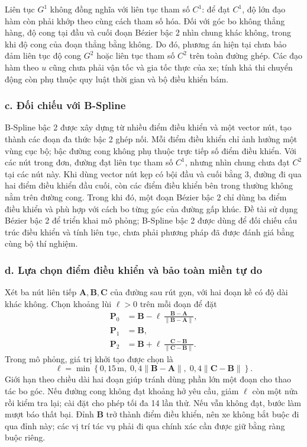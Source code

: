 \documentclass[12pt,a4paper,oneside]{report}
\begin{document}
Liên tục \(G^1\) không đồng nghĩa với liên tục tham số \(C^1\): để đạt \(C^1\), độ lớn đạo hàm còn phải khớp theo cùng cách tham số hóa. Đối với góc bo không thẳng hàng, độ cong tại đầu và cuối đoạn Bézier bậc 2 nhìn chung khác không, trong khi độ cong của đoạn thẳng bằng không. Do đó, phương án hiện tại chưa bảo đảm liên tục độ cong \(G^2\) hoặc liên tục tham số \(C^2\) trên toàn đường ghép. Các đạo hàm theo \(u\) cũng chưa phải vận tốc và gia tốc thực của xe; tính khả thi chuyển động còn phụ thuộc quy luật thời gian và bộ điều khiển bám.

\subsubsection*{c. Đối chiếu với B-Spline}

B-Spline bậc 2 được xây dựng từ nhiều điểm điều khiển và một vector nút, tạo thành các đoạn đa thức bậc 2 ghép nối. Mỗi điểm điều khiển chỉ ảnh hưởng một vùng cục bộ; bậc đường cong không phụ thuộc trực tiếp số điểm điều khiển. Với các nút trong đơn, đường đạt liên tục tham số \(C^1\), nhưng nhìn chung chưa đạt \(C^2\) tại các nút này. Khi dùng vector nút kẹp có bội đầu và cuối bằng 3, đường đi qua hai điểm điều khiển đầu cuối, còn các điểm điều khiển bên trong thường không nằm trên đường cong. Trong khi đó, một đoạn Bézier bậc 2 chỉ dùng ba điểm điều khiển và phù hợp với cách bo từng góc của đường gấp khúc. Đề tài sử dụng Bézier bậc 2 để triển khai mô phỏng; B-Spline bậc 2 được dùng để đối chiếu cấu trúc điều khiển và tính liên tục, chưa phải phương pháp đã được đánh giá bằng cùng bộ thí nghiệm.

\subsubsection*{d. Lựa chọn điểm điều khiển và bảo toàn miền tự do}

Xét ba nút liên tiếp \(\mathbf A,\mathbf B,\mathbf C\) của đường sau rút gọn, với hai đoạn kề có độ dài khác không. Chọn khoảng lùi \(\ell>0\) trên mỗi đoạn để đặt
\begin{equation}
  \begin{aligned}
    \mathbf P_0&=\mathbf B-\ell\,
      \frac{\mathbf B-\mathbf A}{\|\mathbf B-\mathbf A\|},\\
    \mathbf P_1&=\mathbf B,\\
    \mathbf P_2&=\mathbf B+\ell\,
      \frac{\mathbf C-\mathbf B}{\|\mathbf C-\mathbf B\|}.
  \end{aligned}
  \label{eq:smooth-bezier-corner}
\end{equation}
Trong mô phỏng, giá trị khởi tạo được chọn là
\[
  \ell=\min\!\left\{0{,}15\,\mathrm{m},\;
       0{,}4\|\mathbf B-\mathbf A\|,\;
       0{,}4\|\mathbf C-\mathbf B\|\right\}.
\]
Giới hạn theo chiều dài hai đoạn giúp tránh dùng phần lớn một đoạn cho thao tác bo góc. Nếu đường cong không đạt khoảng hở yêu cầu, giảm \(\ell\) còn một nửa rồi kiểm tra lại; cài đặt cho phép tối đa 14 lần thử. Nếu vẫn không đạt, bước làm mượt báo thất bại. Đỉnh \(\mathbf B\) trở thành điểm điều khiển, nên xe không bắt buộc đi qua đỉnh này; các vị trí tác vụ phải đi qua chính xác cần được giữ bằng ràng buộc riêng.
\end{document}
